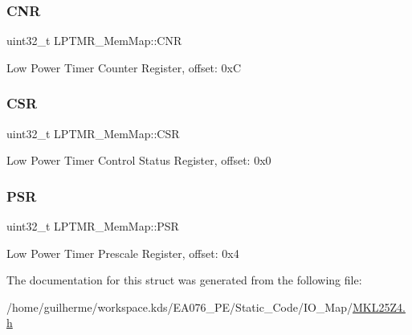 \subsubsection{\texorpdfstring{C\+NR}{CNR}}
{\footnotesize\ttfamily uint32\+\_\+t L\+P\+T\+M\+R\+\_\+\+Mem\+Map\+::\+C\+NR}

Low Power Timer Counter Register, offset\+: 0xC \mbox{\label{struct_l_p_t_m_r___mem_map_a4dcb593756f09d67e3d064d95e3f2d68}} 
\subsubsection{\texorpdfstring{C\+SR}{CSR}}
{\footnotesize\ttfamily uint32\+\_\+t L\+P\+T\+M\+R\+\_\+\+Mem\+Map\+::\+C\+SR}

Low Power Timer Control Status Register, offset\+: 0x0 \mbox{\label{struct_l_p_t_m_r___mem_map_a05f0c5c90722e5a1757c262c818d2462}} 
\subsubsection{\texorpdfstring{P\+SR}{PSR}}
{\footnotesize\ttfamily uint32\+\_\+t L\+P\+T\+M\+R\+\_\+\+Mem\+Map\+::\+P\+SR}

Low Power Timer Prescale Register, offset\+: 0x4 

The documentation for this struct was generated from the following file\+:\begin{DoxyCompactItemize}
\item 
/home/guilherme/workspace.\+kds/\+E\+A076\+\_\+\+P\+E/\+Static\+\_\+\+Code/\+I\+O\+\_\+\+Map/\hyperlink{_m_k_l25_z4_8h}{M\+K\+L25\+Z4.\+h}\end{DoxyCompactItemize}
